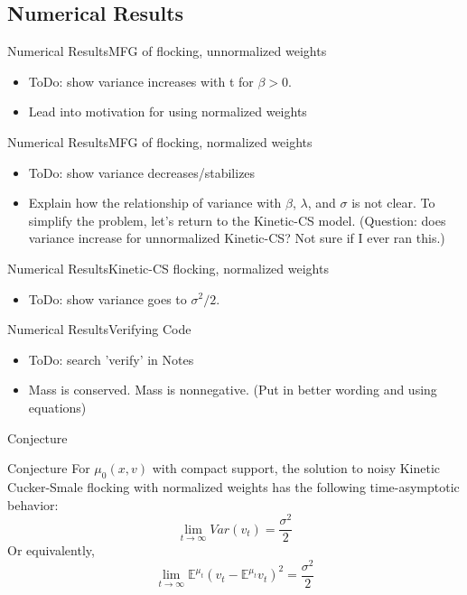 \documentclass{beamer}
\begin{document}
\subsection{Numerical Results}

\begin{frame}{Numerical Results}{MFG of flocking, unnormalized weights}
	\begin{itemize}
		\item {
			ToDo: show variance increases with t for $\beta >0$.
		}
		\item {
			Lead into motivation for using normalized weights
		}
	\end{itemize}
\end{frame}

\begin{frame}{Numerical Results}{MFG of flocking, normalized weights}
	\begin{itemize}
		\item {
			ToDo: show variance decreases/stabilizes
		}
		\item {
			Explain how the relationship of variance with $\beta$, $\lambda$, and $\sigma$ is not clear. To simplify the problem, let's return to the Kinetic-CS model. (Question: does variance increase for unnormalized Kinetic-CS? Not sure if I ever ran this.)
		}
	\end{itemize}
\end{frame}

\begin{frame}{Numerical Results}{Kinetic-CS flocking, normalized weights}
	\begin{itemize}
		\item {
			ToDo: show variance goes to $\sigma^2/2$.
		}
	\end{itemize}
\end{frame}

\begin{frame}{Numerical Results}{Verifying Code}
	\begin{itemize}
		\item {
			ToDo: search 'verify' in Notes
		}
		\item {
			Mass is conserved. Mass is nonnegative. (Put in better wording and using equations)
		}
	\end{itemize}
\end{frame}

\begin{frame}{Conjecture}
	\begin{block}{Conjecture}
		For $\mu_0(x,v)$ with compact support, the solution to noisy Kinetic Cucker-Smale flocking with normalized weights has the following time-asymptotic behavior:
			\begin{equation}
			\lim_{t \rightarrow \infty} Var(v_t)=\frac{\sigma^2}{2} 
			\end{equation}
			Or equivalently,
			\begin{equation}
			\lim_{t \rightarrow \infty} \mathbb{E}^{\mu_t}(v_t-\mathbb{E}^{\mu_t}v_t)^2=\frac{\sigma^2}{2}
			\end{equation}
	\end{block}
\end{frame}
\end{document}
